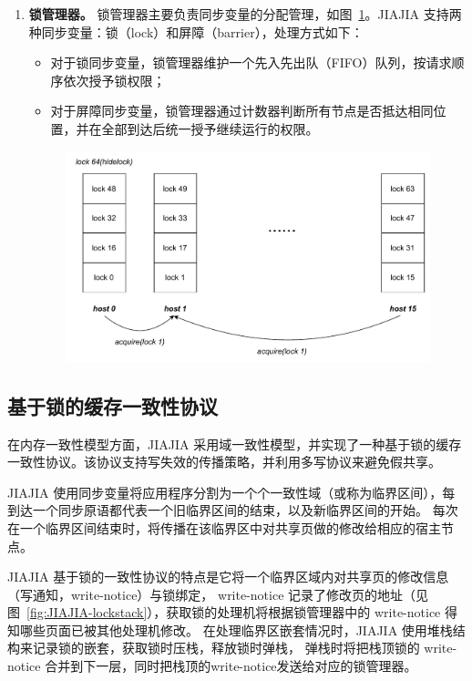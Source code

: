 {\begin{enumerate}[label=\arabic*.]
        \item \textbf{锁管理器。}
              锁管理器主要负责同步变量的分配管理，如图~\ref{fig:JIAJIA-lock-manager}。JIAJIA 支持两种同步变量：锁（lock）和屏障（barrier），处理方式如下：
              \begin{itemize}
                  \item 对于锁同步变量，锁管理器维护一个先入先出队（FIFO）队列，按请求顺序依次授予锁权限；
                  \item 对于屏障同步变量，锁管理器通过计数器判断所有节点是否抵达相同位置，并在全部到达后统一授予继续运行的权限。
              \end{itemize}
              \begin{figure}[!htbp]
                  \centering
                  \includegraphics[width=1.0\textwidth]{Img/JIAJIA锁管理器.drawio.pdf}
                  \label{fig:JIAJIA-lock-manager}
              \end{figure}
    \end{enumerate}

    \subsection{基于锁的缓存一致性协议}
    在内存一致性模型方面，JIAJIA 采用域一致性模型，并实现了一种基于锁的缓存一致性协议。该协议支持写失效的传播策略，并利用多写协议来避免假共享。

    JIAJIA 使用同步变量将应用程序分割为一个个一致性域（或称为临界区间），每到达一个同步原语都代表一个旧临界区间的结束，以及新临界区间的开始。
    每次在一个临界区间结束时，将传播在该临界区中对共享页做的修改给相应的宿主节点。

    JIAJIA 基于锁的一致性协议的特点是它将一个临界区域内对共享页的修改信息（写通知，write-notice）与锁绑定，
    write-notice 记录了修改页的地址（见图~\ref{fig:JIAJIA-lockstack}），获取锁的处理机将根据锁管理器中的 write-notice 得知哪些页面已被其他处理机修改。
    在处理临界区嵌套情况时，JIAJIA 使用堆栈结构来记录锁的嵌套，获取锁时压栈，释放锁时弹栈，
    弹栈时将把栈顶锁的 write-notice 合并到下一层，同时把栈顶的write-notice发送给对应的锁管理器。

}
